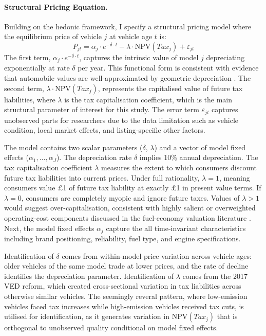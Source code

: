 \documentclass[12pt, a4paper]{article}
\begin{document}
\paragraph{Structural Pricing Equation.}
Building on the hedonic framework, I specify a structural pricing model where the equilibrium price of vehicle $j$ at vehicle age $t$ is:
\begin{equation}
    P_{jt} = \alpha_j \cdot e^{-\delta \cdot t} - \lambda \cdot \text{NPV}(Tax_j) + \varepsilon_{jt}
    \label{eq:structural}
\end{equation}
The first term, $\alpha_j \cdot e^{-\delta \cdot t}$, captures the intrinsic value of model $j$ depreciating exponentially at rate $\delta$ per year. This functional form is consistent with evidence that automobile values are well-approximated by geometric depreciation \citep{kahn1986,storchmann2004}. The second term, $\lambda \cdot \text{NPV}(Tax_j)$, represents the capitalised value of future tax liabilities, where $\lambda$ is the tax capitalisation coefficient, which is the main structural parameter of interest for this study. The error term $\varepsilon_{jt}$ captures unobserved parts for researchers due to the data limitation such as vehicle condition, local market effects, and listing-specific other factors.

The model contains two scalar parameters ($\delta$, $\lambda$) and a vector of model fixed effects ($\alpha_1, ..., \alpha_J$). The depreciation rate $\delta$ implies 10\% annual depreciation. The tax capitalisation coefficient $\lambda$ measures the extent to which consumers discount future tax liabilities into current prices. Under full rationality, $\lambda = 1$, meaning consumers value £1 of future tax liability at exactly £1 in present value terms. If $\lambda = 0$, consumers are completely myopic and ignore future taxes. Values of $\lambda > 1$ would suggest over-capitalisation, consistent with highly salient or overweighted operating-cost components discussed in the fuel-economy valuation literature \citep{allcott2014,grigolon2018,sallee2016}.
Next, the model fixed effects $\alpha_j$ capture the all time-invariant characteristics including brand positioning, reliability, fuel type, and engine specifications.

Identification of $\delta$ comes from within-model price variation across vehicle ages: older vehicles of the same model trade at lower prices, and the rate of decline identifies the depreciation parameter. Identification of $\lambda$ comes from the 2017 VED reform, which created cross-sectional variation in tax liabilities across otherwise similar vehicles. The seemingly reveral pattern, where low-emission vehicles faced tax increases while high-emission vehicles received tax cuts, is utilised for identification, as it generates variation in $\text{NPV}(Tax_j)$ that is orthogonal to unobserved quality conditional on model fixed effects.
\end{document}

